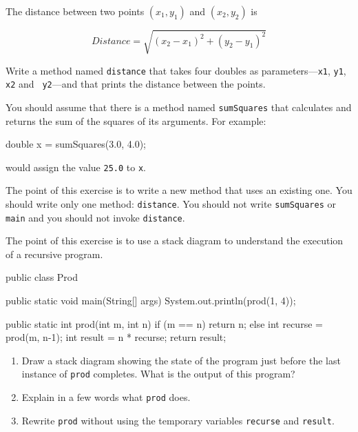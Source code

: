 \begin{exercise}
The distance between two points $(x_1, y_1)$ and $(x_2, y_2)$ is

\[ Distance = \sqrt{(x_2 - x_1)^2 +(y_2 - y_1)^2} \]

Write a method named {\tt distance} that takes four
doubles as parameters---{\tt x1}, {\tt y1}, {\tt x2} and {\tt
y2}---and that prints the distance between the points.

You should assume that there is a method named {\tt sumSquares}
that calculates and returns the sum of the squares of its arguments.
For example:

\begin{code}
    double x = sumSquares(3.0, 4.0);
\end{code}

would assign the value {\tt 25.0} to {\tt x}.

The point of this exercise is to write a new method that uses an
existing one.  You should write only one method: {\tt distance}.  You
should not write {\tt sumSquares} or {\tt main} and you should not
invoke {\tt distance}.
\end{exercise}


\begin{exercise}
The point of this exercise is to use a stack diagram to understand
the execution of a recursive program.

\begin{code}
public class Prod {

    public static void main(String[] args) {
        System.out.println(prod(1, 4));
    }

    public static int prod(int m, int n) {
        if (m == n) {
            return n;
        } else {
            int recurse = prod(m, n-1);
            int result = n * recurse;
            return result;
        }
    }
}
\end{code}

\begin{enumerate}

\item Draw a stack diagram showing the state of the program just
before the last instance of {\tt prod} completes.
What is the output of this program?

\item Explain in a few words what {\tt prod} does.

\item Rewrite {\tt prod} without using the temporary variables
{\tt recurse} and {\tt result}.

\end{enumerate}
\end{exercise}


